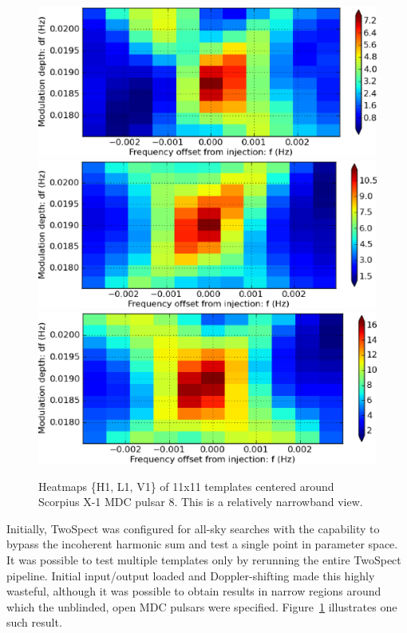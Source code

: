\begin{figure}
\begin{center}
\includegraphics[width=0.6\paperwidth,height=0.2\paperheight]{heatmapH1.eps}
\includegraphics[width=0.6\paperwidth,height=0.2\paperheight]{heatmapL1.eps}
\includegraphics[width=0.6\paperwidth,height=0.2\paperheight]{heatmapV1.eps}
\caption{Heatmaps \{H1, L1, V1\} of 11x11 templates centered around
Scorpius X-1 MDC pulsar 8. 
This is a relatively narrowband view.
}
\label{scox1-narrow-heatmap-008}
\end{center}
\end{figure}

Initially, TwoSpect was configured for all-sky searches with the capability to bypass the incoherent harmonic sum and test a single point in parameter space.
It was possible to test multiple templates only by rerunning the entire TwoSpect pipeline.
Initial input/output loaded and Doppler-shifting made this highly wasteful, although it was possible to obtain results in narrow regions around which the unblinded, open MDC pulsars were specified.
Figure~\ref{scox1-narrow-heatmap-008} illustrates one such result.

